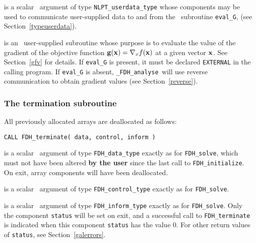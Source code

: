 \documentclass{galahad}
\newcommand{\packagename}{FDH}
\newcommand{\fullpackagename}{\libraryname\_\packagename}
\newcommand{\solver}{{\tt \fullpackagename\_analyse}}
\begin{document}
\begin{description}
 is a scalar \intentinout\ argument of type 
{\tt NLPT\_userdata\_type} whose components may be used
to communicate user-supplied data to and from the
\optional\ subroutine {\tt eval\_G},
(see Section~\ref{typeuserdata}). 

 is an \optional\ 
user-supplied subroutine whose purpose is to evaluate the value of the 
gradient of the objective function ${\mathbf{g}}({\mathbf{x}}) = \nabla_x f({\mathbf{x}})$ 
at a given vector ${\mathbf{x}}$.
See Section~\ref{gfv} for details.
If {\tt eval\_G} is present, 
it must be declared {\tt EXTERNAL} in the calling program.
If {\tt eval\_G} is absent, \solver\ will use reverse communication to
obtain gradient values (see Section~\ref{reverse}).

\end{description}


\subsubsection{The  termination subroutine}
All previously allocated arrays are deallocated as follows:
\vspace*{1mm}

\hspace{8mm}
{\tt CALL \packagename\_terminate( data, control, inform )}

\vspace*{-1mm}
\begin{description}

 is a scalar \intentinout\ argument of type 
{\tt \packagename\_data\_type} 
exactly as for
{\tt \packagename\_solve},
which must not have been altered {\bf by the user} since the last call to 
{\tt \packagename\_initialize}.
On exit, array components will have been deallocated.

 is a scalar \intentin\ argument of type 
{\tt \packagename\_control\_type}
exactly as for
{\tt \packagename\_solve}.

 is a scalar \intentout\ argument of type
{\tt \packagename\_inform\_type}
exactly as for
{\tt \packagename\_solve}.
Only the component {\tt status} will be set on exit, and a 
successful call to 
{\tt \packagename\_terminate}
is indicated when this  component {\tt status} has the value 0. 
For other return values of {\tt status}, see Section~\ref{galerrors}.

\end{description}
\end{document}
